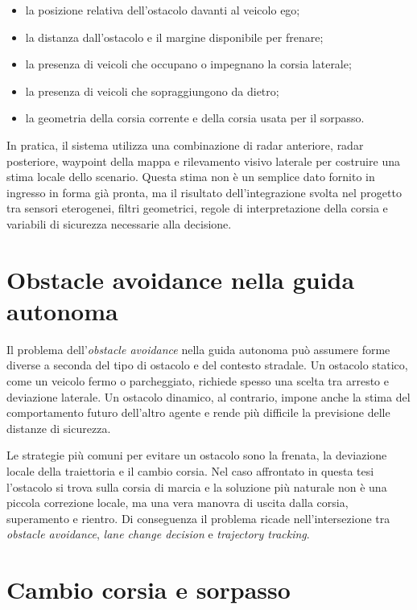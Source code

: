 \begin{itemize}
    \item la posizione relativa dell'ostacolo davanti al veicolo ego;
    \item la distanza dall'ostacolo e il margine disponibile per frenare;
    \item la presenza di veicoli che occupano o impegnano la corsia laterale;
    \item la presenza di veicoli che sopraggiungono da dietro;
    \item la geometria della corsia corrente e della corsia usata per il sorpasso.
\end{itemize}

In pratica, il sistema utilizza una combinazione di radar anteriore, radar posteriore, waypoint della mappa e rilevamento visivo laterale per costruire una stima locale dello scenario. Questa stima non è un semplice dato fornito in ingresso in forma già pronta, ma il risultato dell'integrazione svolta nel progetto tra sensori eterogenei, filtri geometrici, regole di interpretazione della corsia e variabili di sicurezza necessarie alla decisione.

\section{Obstacle avoidance nella guida autonoma}

Il problema dell'\textit{obstacle avoidance} nella guida autonoma può assumere forme diverse a seconda del tipo di ostacolo e del contesto stradale. Un ostacolo statico, come un veicolo fermo o parcheggiato, richiede spesso una scelta tra arresto e deviazione laterale. Un ostacolo dinamico, al contrario, impone anche la stima del comportamento futuro dell'altro agente e rende più difficile la previsione delle distanze di sicurezza.

Le strategie più comuni per evitare un ostacolo sono la frenata, la deviazione locale della traiettoria e il cambio corsia. Nel caso affrontato in questa tesi l'ostacolo si trova sulla corsia di marcia e la soluzione più naturale non è una piccola correzione locale, ma una vera manovra di uscita dalla corsia, superamento e rientro. Di conseguenza il problema ricade nell'intersezione tra \textit{obstacle avoidance}, \textit{lane change decision} e \textit{trajectory tracking}.

\section{Cambio corsia e sorpasso}

